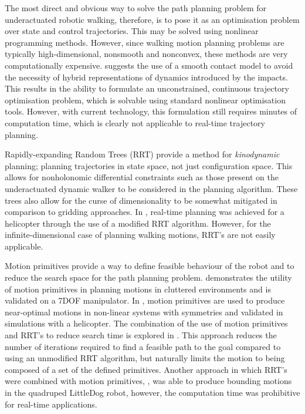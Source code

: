 The most direct and obvious way to solve the path planning problem for underactuated robotic walking, therefore, is to pose it as an optimisation problem over state and control trajectories. This may be solved using nonlinear programming methods. However, since walking motion planning problems are typically high-dimensional, nonsmooth and nonconvex, these methods are very computationally expensive. \cite{tassa2012synthesis} suggests the use of a smooth contact model to avoid the necessity of hybrid representations of dynamics introduced by the impacts. This results in the ability to formulate an unconstrained, continuous trajectory optimisation problem, which is solvable using standard nonlinear optimisation tools. However, with current technology, this formulation still requires minutes of computation time, which is clearly not applicable to real-time trajectory planning. 

Rapidly-expanding Random Trees (RRT) \cite{lavalle2001randomized} provide a method for \textit{kinodynamic} planning; planning trajectories in state space, not just configuration space. This allows for nonholonomic differential constraints such as those present on the underactuated dynamic walker to be considered in the planning algorithm. These trees also allow for the curse of dimensionality to be somewhat mitigated in comparison to gridding approaches. In \cite{frazzoli2002real}, real-time planning was achieved for a helicopter through the use of a modified RRT algorithm. However, for the infinite-dimensional case of planning walking motions, RRT's are not easily applicable. 

Motion primitives provide a way to define feasible behaviour of the robot and to reduce the search space for the path planning problem. \cite{cohen2011planning} demonstrates the utility of motion primitives in planning motions in cluttered environments and is validated on a 7DOF manipulator. In \cite{frazzoli2005maneuver}, motion primitives are used to produce near-optimal motions in non-linear systems with symmetries and validated in simulations with a helicopter. The combination of the use of motion primitives and RRT's to reduce search time is explored in \cite{vonasek2013global}. This approach reduces the number of iterations required to find a feasible path to the goal compared to using an unmodified RRT algorithm, but naturally limits the motion to being composed of a set of the defined primitives. Another approach in which RRT's were combined with motion primitives, \cite{shkolnik2011bounding}, was able to produce bounding motions in the quadruped LittleDog robot, however, the computation time was prohibitive for real-time applications. 

